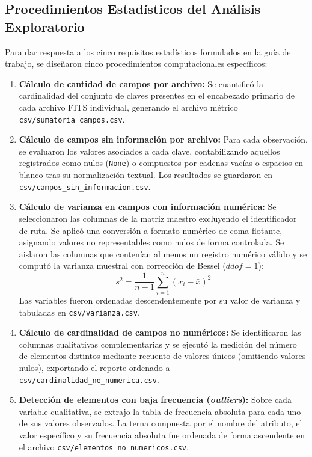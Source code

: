 \documentclass[10pt]{article}
\begin{document}
\subsection{Procedimientos Estadísticos del Análisis Exploratorio}
Para dar respuesta a los cinco requisitos estadísticos formulados en la guía de trabajo, se diseñaron cinco procedimientos computacionales específicos:
\begin{enumerate}
    \item \textbf{Cálculo de cantidad de campos por archivo:} Se cuantificó la cardinalidad del conjunto de claves presentes en el encabezado primario de cada archivo FITS individual, generando el archivo métrico \texttt{csv/sumatoria\_campos.csv}.
    \item \textbf{Cálculo de campos sin información por archivo:} Para cada observación, se evaluaron los valores asociados a cada clave, contabilizando aquellos registrados como nulos (\texttt{None}) o compuestos por cadenas vacías o espacios en blanco tras su normalización textual. Los resultados se guardaron en \texttt{csv/campos\_sin\_informacion.csv}.
    \item \textbf{Cálculo de varianza en campos con información numérica:} Se seleccionaron las columnas de la matriz maestro excluyendo el identificador de ruta. Se aplicó una conversión a formato numérico de coma flotante, asignando valores no representables como nulos de forma controlada. Se aislaron las columnas que contenían al menos un registro numérico válido y se computó la varianza muestral con corrección de Bessel ($ddof=1$):
    \begin{equation}
        s^2 = \frac{1}{n-1}\sum_{i=1}^{n}(x_i - \bar{x})^2
    \end{equation}
    Las variables fueron ordenadas descendentemente por su valor de varianza y tabuladas en \texttt{csv/varianza.csv}.
    \item \textbf{Cálculo de cardinalidad de campos no numéricos:} Se identificaron las columnas cualitativas complementarias y se ejecutó la medición del número de elementos distintos mediante recuento de valores únicos (omitiendo valores nulos), exportando el reporte ordenado a \texttt{csv/cardinalidad\_no\_numerica.csv}.
    \item \textbf{Detección de elementos con baja frecuencia (\textit{outliers}):} Sobre cada variable cualitativa, se extrajo la tabla de frecuencia absoluta para cada uno de sus valores observados. La terna compuesta por el nombre del atributo, el valor específico y su frecuencia absoluta fue ordenada de forma ascendente en el archivo \texttt{csv/elementos\_no\_numericos.csv}.
\end{enumerate}
\end{document}
